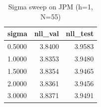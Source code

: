 \documentclass{article}
\begin{document}
\begin{table}[ht]
\centering
\caption{Sigma sweep on JPM (h=1, N=55)}
\label{tab:sigma}
\begin{tabular}{lrr}
\toprule
sigma & nll_val & nll_test \\
\midrule
0.5000 & 3.8400 & 3.9583 \\
1.0000 & 3.8353 & 3.9480 \\
1.5000 & 3.8354 & 3.9465 \\
2.0000 & 3.8361 & 3.9456 \\
3.0000 & 3.8371 & 3.9491 \\
\bottomrule
\end{tabular}
\end{table}
\end{document}
